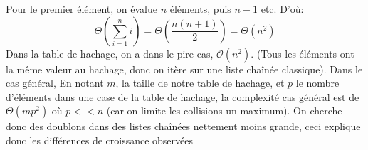 \documentclass{article}
\begin{document}
    Pour le premier élément, on évalue $n$ éléments, puis $n-1$ etc.
    D'où:
    $$ \Theta\left(\sum^n_{i=1} i\right)  = \Theta\left(\frac{n(n+1)}{2}\right) = \Theta(n^2)$$  
    \newline
    Dans la table de hachage, on a dans le pire cas, $\mathcal O(n^2)$. (Tous les éléments ont la même valeur au hachage, donc on itère sur une liste chaînée classique).
    \newline
    Dans le cas général,
    En notant $m$, la taille de notre table de hachage, et $p$ le nombre d'éléments dans une 
    case de la table de hachage,
    la complexité cas général est de $\Theta(mp^2)$ où $p << n$ (car on limite les collisions un maximum).
    \newline
    On cherche donc des doublons dans des listes chaînées nettement moins grande,
    ceci explique donc les différences de croissance observées

        
\end{document}
